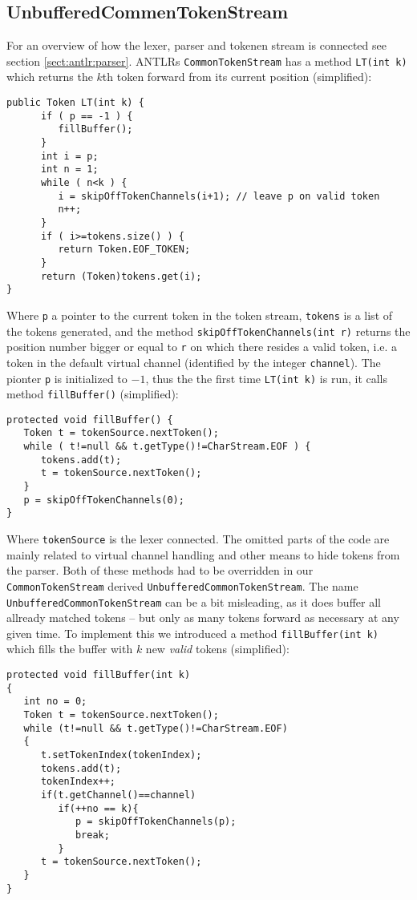 \subsection{UnbufferedCommenTokenStream}
For an overview of how the lexer, parser and tokenen stream is connected see section \ref{sect:antlr:parser}. ANTLRs \verb!CommonTokenStream! has a method \verb!LT(int k)! which returns the $k$th token forward from its current position (simplified):
\begin{verbatim}
public Token LT(int k) {
      if ( p == -1 ) {
         fillBuffer();
      }
      int i = p;
      int n = 1;
      while ( n<k ) {
         i = skipOffTokenChannels(i+1); // leave p on valid token
         n++;
      }
      if ( i>=tokens.size() ) {
         return Token.EOF_TOKEN;
      }
      return (Token)tokens.get(i);
}
\end{verbatim}
Where \verb!p! a pointer to the current token in the token stream, \verb!tokens! is a list of the tokens generated, and the method \verb!skipOffTokenChannels(int r)! returns the position number bigger or equal to \verb!r! on which there resides a valid token, i.e. a token in the default virtual channel (identified by the integer \verb!channel!). The pionter \verb!p! is initialized to $-1$, thus the the first time \verb!LT(int k)! is run, it calls method \verb!fillBuffer()! (simplified):
\begin{verbatim}
protected void fillBuffer() {
   Token t = tokenSource.nextToken();
   while ( t!=null && t.getType()!=CharStream.EOF ) {
      tokens.add(t);
      t = tokenSource.nextToken();
   }
   p = skipOffTokenChannels(0);
}
\end{verbatim}
Where \verb!tokenSource! is the lexer connected. The omitted parts of the code are mainly related to virtual channel handling and other means to hide tokens from the parser. Both of these methods had to be overridden in our \verb!CommonTokenStream! derived \verb!UnbufferedCommonTokenStream!. The name \verb!UnbufferedCommonTokenStream! can be a bit misleading, as it does buffer all allready matched tokens -- but only as many tokens forward as necessary at any given time. To implement this we introduced a method \verb!fillBuffer(int k)! which fills the buffer with $k$ new \emph{valid} tokens (simplified):
\begin{verbatim}
protected void fillBuffer(int k) 
{
   int no = 0;
   Token t = tokenSource.nextToken();
   while (t!=null && t.getType()!=CharStream.EOF) 
   {
      t.setTokenIndex(tokenIndex);
      tokens.add(t);
      tokenIndex++;
      if(t.getChannel()==channel)
         if(++no == k){
            p = skipOffTokenChannels(p);
            break;
         }
      t = tokenSource.nextToken();
   }
}
\end{verbatim}
